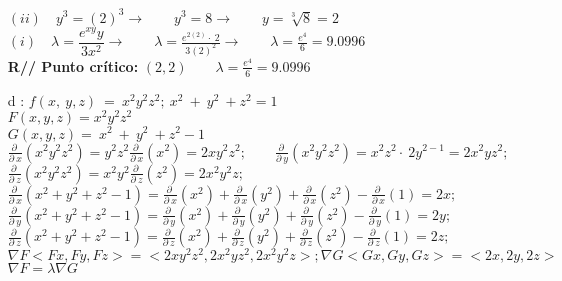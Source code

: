 \documentclass[13pt]{memoir}
\begin{document}
\begin{enumerate}
$\left(ii\right)\quad y^3 = (2)^3  \rightarrow\qquad   y^3 = 8 \rightarrow\qquad y = \sqrt[3]{8}=2  $\\

$\left(i\right)\quad \lambda = \dfrac{e^{xy}y}{3x^2}  \rightarrow\qquad  \lambda = \frac{e^{2\left(2\right)}\cdot \:2}{3\left(2\right)^2}  \rightarrow\qquad \lambda = \frac{e^4}{6} = 9.0996$\\


\textbf{R// Punto crítico: }
$\left(2,2 \right) \qquad  \lambda = \frac{e^4}{6} = 9.0996$\\

\item[ d]: $f\left(x,\:y,z\right)\:=\:x^2y^2z^2;\:x^2\:+\:y^2\:+z^2=1\:$ \\

$F(x, y, z) = x^2y^2z^2$ \\
$G(x, y, z) = \:x^2\:+\:y^2\:+z^2-1\:$ \\

$\frac{\partial \:}{\partial \:x}\left(x^2y^2z^2\right) =y^2z^2\frac{\partial \:}{\partial \:x}\left(x^2\right) = 2xy^2z^2; \qquad \frac{\partial \:}{\partial \:y}\left(x^2y^2z^2\right) = x^2z^2\cdot \:2y^{2-1} =2x^2yz^2; \qquad $\\
$\frac{\partial \:}{\partial \:z}\left(x^2y^2z^2\right) =x^2y^2\frac{\partial \:}{\partial \:z}\left(z^2\right) = 2x^2y^2z;$\\

$\frac{\partial \:}{\partial \:x}\left(x^2+y^2+z^2-1\right) = \frac{\partial \:}{\partial \:x}\left(x^2\right)+\frac{\partial \:}{\partial \:x}\left(y^2\right)+\frac{\partial \:}{\partial \:x}\left(z^2\right)-\frac{\partial \:}{\partial \:x}\left(1\right) =2x;$\\
$\frac{\partial \:}{\partial \:y}\left(x^2+y^2+z^2-1\right) = \frac{\partial \:}{\partial \:y}\left(x^2\right)+\frac{\partial \:}{\partial \:y}\left(y^2\right)+\frac{\partial \:}{\partial \:y}\left(z^2\right)-\frac{\partial \:}{\partial \:y}\left(1\right) = 2y;$\\
$\frac{\partial \:}{\partial \:z}\left(x^2+y^2+z^2-1\right) = \frac{\partial \:}{\partial \:z}\left(x^2\right)+\frac{\partial \:}{\partial \:z}\left(y^2\right)+\frac{\partial \:}{\partial \:z}\left(z^2\right)-\frac{\partial \:}{\partial \:z}\left(1\right) = 2z;$\\

$\nabla F <Fx, Fy, Fz> = <2xy^2z^2, 2x^2yz^2, 2x^2y^2z>; \nabla G <Gx, Gy, Gz> = <2x,2y,2z>$ \\
$\nabla F = \lambda \nabla G$\\


\end{enumerate}
\end{document}
